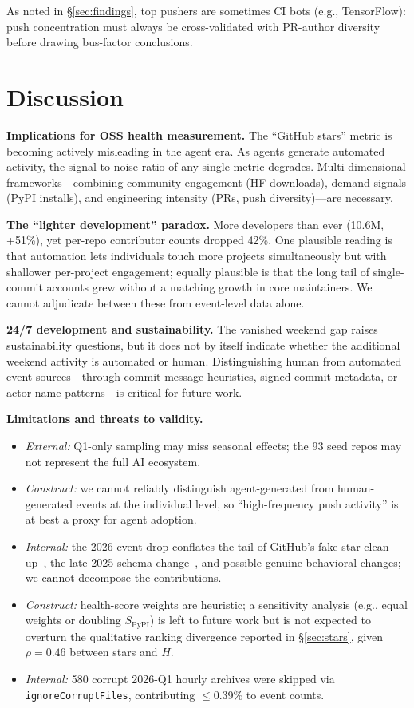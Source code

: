 \documentclass[11pt,twocolumn]{article}
\begin{document}
As noted in \S\ref{sec:findings}, top pushers are sometimes CI bots (e.g., TensorFlow): push concentration must always be cross-validated with PR-author diversity before drawing bus-factor conclusions.

\section{Discussion}\label{sec:discussion}

\textbf{Implications for OSS health measurement.}
The ``GitHub stars'' metric is becoming actively misleading in the agent era.
As agents generate automated activity, the signal-to-noise ratio of any single metric degrades.
Multi-dimensional frameworks---combining community engagement (HF downloads), demand signals (PyPI installs), and engineering intensity (PRs, push diversity)---are necessary.

\textbf{The ``lighter development'' paradox.}
More developers than ever (10.6M, +51\%), yet per-repo contributor counts dropped 42\%.
One plausible reading is that automation lets individuals touch more projects simultaneously but with shallower per-project engagement; equally plausible is that the long tail of single-commit accounts grew without a matching growth in core maintainers. We cannot adjudicate between these from event-level data alone.

\textbf{24/7 development and sustainability.}
The vanished weekend gap raises sustainability questions, but it does not by itself indicate whether the additional weekend activity is automated or human.
Distinguishing human from automated event sources---through commit-message heuristics, signed-commit metadata, or actor-name patterns---is critical for future work.

\textbf{Limitations and threats to validity.}
\begin{itemize}[nosep]
  \item \emph{External:} Q1-only sampling may miss seasonal effects; the 93 seed repos may not represent the full AI ecosystem.
  \item \emph{Construct:} we cannot reliably distinguish agent-generated from human-generated events at the individual level, so ``high-frequency push activity'' is at best a proxy for agent adoption.
  \item \emph{Internal:} the 2026 event drop conflates the tail of GitHub's fake-star clean-up~\cite{he2024fakestars}, the late-2025 schema change~\cite{ghchangelog2025}, and possible genuine behavioral changes; we cannot decompose the contributions.
  \item \emph{Construct:} health-score weights are heuristic; a sensitivity analysis (e.g., equal weights or doubling $S_{\text{PyPI}}$) is left to future work but is not expected to overturn the qualitative ranking divergence reported in \S\ref{sec:stars}, given $\rho = 0.46$ between stars and $H$.
  \item \emph{Internal:} 580 corrupt 2026-Q1 hourly archives were skipped via \texttt{ignoreCorruptFiles}, contributing $\le$0.39\% to event counts.
\end{itemize}
\end{document}
